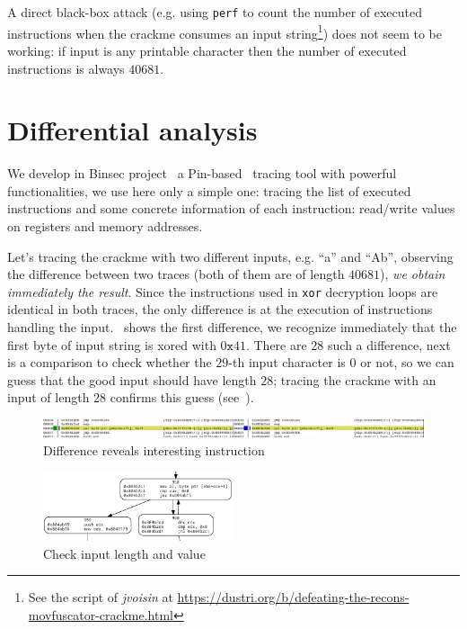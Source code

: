 \documentclass{easychair}
\begin{document}
A direct black-box attack (e.g. using \texttt{perf} to count the number of executed instructions when the crackme consumes an input string\footnote{See the script of \emph{jvoisin} at \url{https://dustri.org/b/defeating-the-recons-movfuscator-crackme.html}}) does not seem to be working: if input is any printable character then the number of executed instructions is always $40681$.

\section{Differential analysis}
We develop in Binsec project~\autocite{binsec} a Pin-based~\autocite{LukCMPKLWRH05} tracing tool with powerful functionalities, we use here only a simple one: tracing the list of executed instructions and some concrete information of each instruction: read/write values on registers and memory addresses.

Let's tracing the crackme with two different inputs, e.g. ``a'' and ``Ab'', observing the difference between two traces (both of them are of length $40681$),  \emph{we obtain immediately the result}. Since the instructions used in \texttt{xor} decryption loops are identical in both traces, the only difference is at the execution of instructions handling the input.~ shows the first difference, we recognize immediately that the first byte of input string is xored with $0\mathtt{x}41$. There are $28$ such a difference, next is a comparison to check whether the $29$-th input character is $0$ or not, so we can guess that the good input should have length $28$; tracing the crackme with an input of length $28$ confirms this guess (see~). 

\begin{figure}[ht]
  \centering
  \includegraphics[width=1.0\textwidth,keepaspectratio]{compare_first.png}
  \caption{Difference reveals interesting instruction}
  \label{fig:firstdiff}
\end{figure}

\begin{figure}[ht]
  \centering
  \includegraphics[width=0.5\textwidth,keepaspectratio]{check_input.png}
  \caption{Check input length and value}
  \label{fig:checkinput}
\end{figure}
\end{document}

